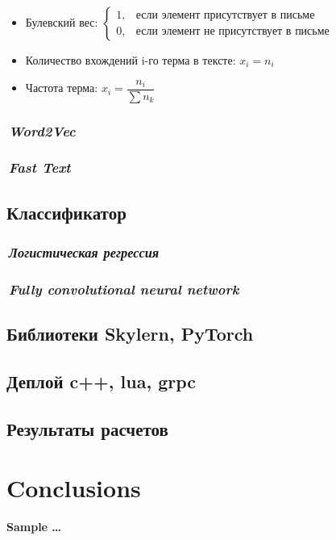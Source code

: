 \documentclass[12pt]{article}
\begin{document}
\begin{itemize}
\item Булевский вес: $\begin{cases} 1, & \mbox{если элемент присутствует в письме} \\ 0, & \mbox{если элемент не присутствует в письме}  \end{cases}$
\item Количество вхождений i-го терма в тексте: $x_i = n_i$
\item Частота терма: $x_i = \dfrac{n_i}{\sum n_k}$
\end{itemize}

\subsubsection*{\it\,Word2Vec}

\subsubsection*{\it\,Fast Text}

\subsection*{Классификатор}

\subsubsection*{\it\,Логистическая регрессия}

\subsubsection*{\it\,Fully convolutional neural network}

\subsection*{Библиотеки Skylern, PyTorch}

\subsection*{Деплой c++, lua, grpc}

\subsection*{Результаты расчетов}

\section{Conclusions}

\begin{thebibliography}{99}
 {\bf\color{ao} Sample \ldots}
\end{thebibliography}
\end{document}
